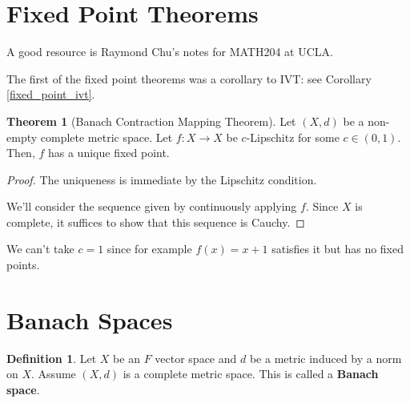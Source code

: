 \documentclass{article}
\theoremstyle{definition}
\newtheorem{definition}{Definition}
\newtheorem{theorem}{Theorem}[section]
\begin{document}
\newpage

\section{Fixed Point Theorems}

A good resource is Raymond Chu's notes for MATH204 at UCLA.

The first of the fixed point theorems was a corollary to IVT: see Corollary \ref{fixed_point_ivt}.

\begin{theorem}[Banach Contraction Mapping Theorem]
    Let $(X,d)$ be a non-empty complete metric space. Let $f: X \xrightarrow{} X$
    be $c$-Lipschitz for some $c \in (0,1)$. Then, $f$ has a unique fixed point.
\end{theorem}
\begin{proof}
    The uniqueness is immediate by the Lipschitz condition.

    We'll consider the sequence given by continuously applying $f$. Since $X$ is complete,
    it suffices to show that this sequence is Cauchy.
\end{proof}

We can't take $c = 1$ since for example $f(x) = x + 1$ satisfies it but has no fixed points.

\newpage

\section{Banach Spaces}

\begin{definition}
    Let $X$ be an $F$ vector space and $d$ be a metric induced by a norm on $X$. Assume 
    $(X,d)$ is a complete metric space. This is called a \textbf{Banach space}.
\end{definition}
\end{document}

